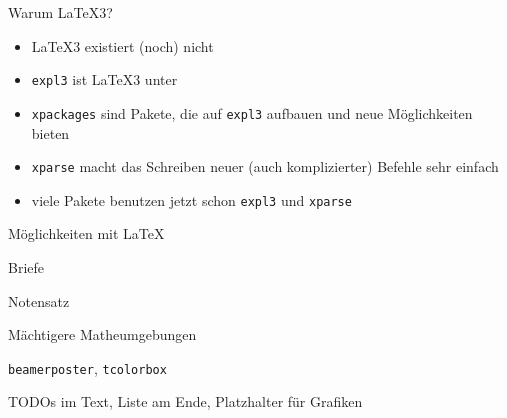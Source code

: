 \begin{frame}[t]
  \vspace{0.1em}
  \centering
\end{frame}

\begin{frame}{Warum \LaTeX3?}
  \begin{itemize}
    \item \LaTeX3 existiert (noch) nicht
    \item \texttt{expl3} ist \LaTeX3 unter \LaTeXe
    \item \texttt{xpackages} sind Pakete, die auf \texttt{expl3} aufbauen und neue Möglichkeiten bieten
    \item \texttt{xparse} macht das Schreiben neuer (auch komplizierter) Befehle sehr einfach
    \item viele Pakete benutzen jetzt schon \texttt{expl3} und \texttt{xparse}
  \end{itemize}
\end{frame}

\begin{frame}[fragile]{Möglichkeiten mit \LaTeX}
  \begin{description}
    \item[\href{http://mirrors.ctan.org/macros/latex/contrib/koma-script/doc/scrguide-de.pdf}{\texttt{scrlettr2}}] Briefe
    \item[\href{http://mirrors.ctan.org/macros/generic/musixtex/doc/musixdoc.pdf}{MusiXTeX}, \href{http://www.lilypond.org/}{Lilypond}] Notensatz
    \item[\href{http://mirrors.ctan.org/macros/latex/contrib/IEEEtran/tools/IEEEtrantools_doc.txt}{\texttt{IEEEtrantools}}] Mächtigere Matheumgebungen
    \item[Poster] \texttt{beamerposter}, \texttt{tcolorbox}
    \item[\href{http://mirrors.ctan.org/macros/latex/contrib/todonotes/todonotes.pdf}{todonotes}] TODOs im Text, Liste am Ende, Platzhalter für Grafiken
  \end{description}
\end{frame}


